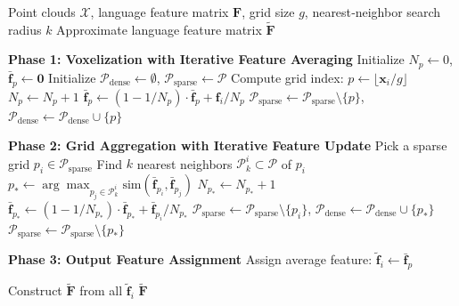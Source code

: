 \documentclass[runningheads]{llncs}
\begin{document}
\begin{algorithm}[tb]
\caption{Grid feature aggregation.}
\label{alg:algorithm}
\begin{algorithmic}[1] %
\Require Point clouds $\mathcal{X}$, language feature matrix $\mathbf{F}$, grid size $g$, nearest‑neighbor search radius $k$
\Ensure Approximate language feature matrix $\tilde{\mathbf{F}}$

\State \textbf{Phase 1: Voxelization with Iterative Feature Averaging}
\State Initialize $N_p \gets 0$, $\bar{\mathbf{f}}_p \gets \mathbf{0}$ 
\State Initialize $\mathcal{P}_{\text{dense}} \gets \emptyset$, $\mathcal{P}_{\text{sparse}} \gets \mathcal{P}$ 
    \State Compute grid index: $p \gets \lfloor \mathbf{x}_i / g \rfloor$
    \State $N_p \gets N_p + 1$ 
    \State $\bar{\mathbf{f}}_p \gets (1-1/{N_p}) \cdot \bar{\mathbf{f}}_p + \mathbf{f}_i/{N_p}$ 
     
        \State $\mathcal{P}_{\text{sparse}} \gets \mathcal{P}_{\text{sparse}} \setminus \{p\}$,  $\mathcal{P}_{\text{dense}} \gets \mathcal{P}_{\text{dense}} \cup \{p\}$
    \EndIf
\EndFor

\State \textbf{Phase 2: Grid Aggregation with Iterative Feature Update}
    \State Pick a sparse grid $p_i \in \mathcal{P}_{\text{sparse}}$
    \State Find $k$ nearest neighbors $\mathcal{P}_k^i \subset \mathcal{P}$ of $p_i$
    \State $p_* \gets \arg\max_{p_j \in \mathcal{P}_k^i} \text{sim}(\bar{\mathbf{f}}_{p_i}, \bar{\mathbf{f}}_{p_j})$
    \State $N_{p_*} \gets N_{p_*} + 1$ 
    \State $\bar{\mathbf{f}}_{p_*} \gets (1 - 1/N_{p_*}) \cdot \bar{\mathbf{f}}_{p_*} + \bar{\mathbf{f}}_{p_i} / N_{p_*}$ 
    \State $\mathcal{P}_{\text{sparse}} \gets \mathcal{P}_{\text{sparse}} \setminus \{p_i\}$, $\mathcal{P}_{\text{dense}} \gets \mathcal{P}_{\text{dense}} \cup \{p_*\}$ 
        \State $\mathcal{P}_{\text{sparse}} \gets \mathcal{P}_{\text{sparse}} \setminus \{p_*\}$
    \EndIf
\EndWhile

\State \textbf{Phase 3: Output Feature Assignment}
        \State Assign average feature: $\tilde{\mathbf{f}}_i \gets \bar{\mathbf{f}}_p$
    \EndFor
\EndFor

\State Construct $\tilde{\mathbf{F}}$ from all $\tilde{\mathbf{f}}_i$
\State \Return $\tilde{\mathbf{F}}$

\end{algorithmic}
\end{algorithm}
\end{document}
